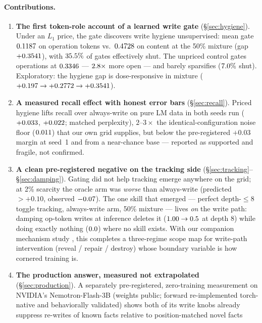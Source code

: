 \documentclass[10pt]{article}
\begin{document}
\paragraph{Contributions.}
\begin{enumerate}
\item \textbf{The first token-role account of a learned write gate} (\S\ref{sec:hygiene}). Under an
$L_1$ price, the gate discovers write hygiene unsupervised: mean gate $0.1187$ on operation
tokens vs.\ $0.4728$ on content at the 50\% mixture (gap $+0.3541$), with
$35.5\%$ of gates effectively shut. The unpriced control gates operations at
$0.3346$ --- $2.8\times$ more open --- and barely sparsifies
($7.0\%$ shut). Exploratory: the hygiene gap is dose-responsive in mixture
($+0.197\to+0.2772\to+0.3541$).
\item \textbf{A measured recall effect with honest error bars} (\S\ref{sec:recall}). Priced hygiene
lifts recall over always-write on pure LM data in both seeds run
($+0.033$, $+0.022$; matched perplexity), $2$--$3\times$ the
identical-configuration noise floor ($0.011$) that our own grid supplies, but below the
pre-registered $+0.03$ margin at seed~1 and from a near-chance base --- reported as supported and
fragile, not confirmed.
\item \textbf{A clean pre-registered negative on the tracking side} (\S\ref{sec:tracking}--\S\ref{sec:damping}).
Gating did not help tracking emerge anywhere on the grid; at 2\% scarcity the oracle arm was
\emph{worse} than always-write (predicted $>+0.10$, observed $-0.07$). The one skill
that emerged --- perfect depth-$\le$8 toggle tracking, always-write arm, 50\% mixture --- lives
\emph{on} the write path: damping op-token writes at inference deletes it
($1.00\to0.5$ at depth 8) while doing exactly nothing
($0.0$) where no skill exists. With our companion mechanism study
\citep{howe2026automaton}, this completes a three-regime scope map for write-path intervention
(reveal / repair / destroy) whose boundary variable is how cornered training is.
\item \textbf{The production answer, measured not extrapolated} (\S\ref{sec:production}). A
separately pre-registered, zero-training measurement on NVIDIA's Nemotron-Flash-3B (weights
public; forward re-implemented torch-native and behaviorally validated) shows both of its write
knobs already suppress re-writes of known facts relative to position-matched novel facts

\end{enumerate}
\end{document}

